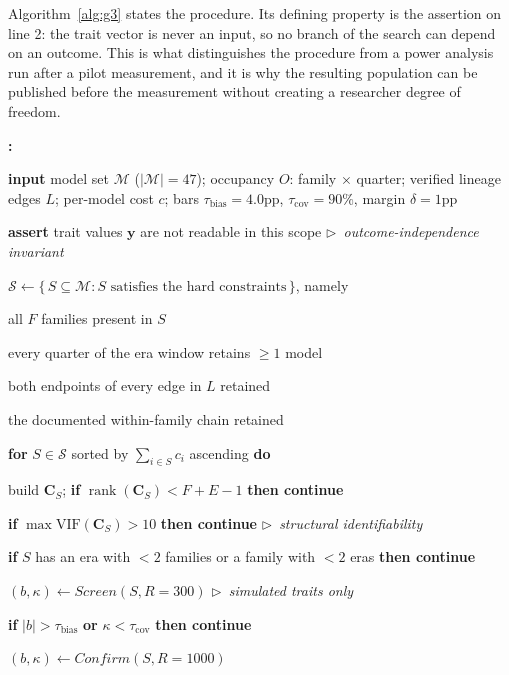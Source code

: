 \documentclass{ieeeaccess}
\theoremstyle{definition}
\theoremstyle{plain}
\newcounter{algstep}
\newenvironment{algsteps}{%
  \footnotesize
  \setcounter{algstep}{0}%
  \begin{list}{\textbf{\thealgstep:}}{%
    \usecounter{algstep}%
    \setlength{\labelwidth}{14pt}%
    \setlength{\labelsep}{4pt}%
    \setlength{\leftmargin}{20pt}%
    \setlength{\rightmargin}{0pt}%
    \setlength{\itemsep}{1pt}%
    \setlength{\parsep}{0pt}%
    \setlength{\topsep}{3pt}%
  }%
}{\end{list}}
\newcommand{\algind}[1]{\hspace*{#1.1em}}
\newcommand{\algkw}[1]{\textbf{#1}}
\newcommand{\algcomment}[1]{\textit{$\triangleright$~#1}}
\begin{document}
Algorithm~\ref{alg:g3} states the procedure. Its defining property is the
assertion on line 2: the trait vector is never an input, so no branch of the
search can depend on an outcome. This is what distinguishes the procedure from
a power analysis run after a pilot measurement, and it is why the resulting
population can be published before the measurement without creating a
researcher degree of freedom.

\begin{algorithm}[t]
\caption{Outcome-independent study-population design (G3)}
\label{alg:g3}
\begin{algsteps}
\item \algkw{input} model set $\mathcal{M}$ ($|\mathcal{M}|=47$); occupancy
  $O$: family $\times$ quarter; verified lineage edges $L$; per-model cost
  $c$; bars $\tau_{\mathrm{bias}}{=}4.0$pp, $\tau_{\mathrm{cov}}{=}90\%$,
  margin $\delta{=}1$pp
\item \algkw{assert} trait values $\mathbf{y}$ are not readable in this scope
  \algcomment{outcome-independence invariant}
\item $\mathcal{S} \leftarrow \{\,S \subseteq \mathcal{M} :
  S \text{ satisfies the hard constraints}\,\}$, namely
\item \algind{1} all $F$ families present in $S$
\item \algind{1} every quarter of the era window retains $\ge1$ model
\item \algind{1} both endpoints of every edge in $L$ retained
\item \algind{1} the documented within-family chain retained
\item \algkw{for} $S \in \mathcal{S}$ sorted by $\sum_{i \in S} c_i$ ascending
  \algkw{do}
\item \algind{1} build $\mathbf{C}_S$; \algkw{if}
  $\operatorname{rank}(\mathbf{C}_S) < F+E-1$ \algkw{then continue}
\item \algind{1} \algkw{if} $\max\mathrm{VIF}(\mathbf{C}_S) > 10$
  \algkw{then continue} \algcomment{structural identifiability}
\item \algind{1} \algkw{if} $S$ has an era with $<2$ families or a family with
  $<2$ eras \algkw{then continue}
\item \algind{1} $(b,\kappa) \leftarrow \textit{Screen}(S, R{=}300)$
  \algcomment{simulated traits only}
\item \algind{1} \algkw{if} $|b| > \tau_{\mathrm{bias}}$ \algkw{or}
  $\kappa < \tau_{\mathrm{cov}}$ \algkw{then continue}
\item \algind{1} $(b,\kappa) \leftarrow \textit{Confirm}(S, R{=}1000)$

\end{algsteps}
\end{algorithm}
\end{document}
